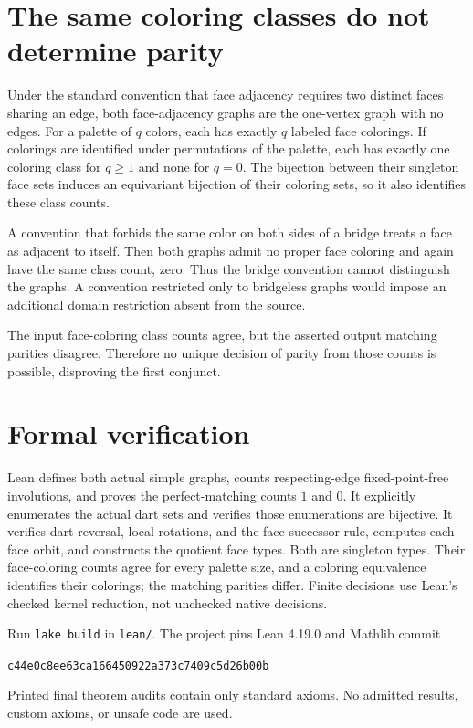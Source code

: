 \documentclass[11pt]{article}
\begin{document}
\section*{The same coloring classes do not determine parity}
Under the standard convention that face adjacency requires two distinct faces sharing an edge, both face-adjacency graphs are the one-vertex graph with no edges. For a palette of $q$ colors, each has exactly $q$ labeled face colorings. If colorings are identified under permutations of the palette, each has exactly one coloring class for $q\ge1$ and none for $q=0$. The bijection between their singleton face sets induces an equivariant bijection of their coloring sets, so it also identifies these class counts.

A convention that forbids the same color on both sides of a bridge treats a face as adjacent to itself. Then both graphs admit no proper face coloring and again have the same class count, zero. Thus the bridge convention cannot distinguish the graphs. A convention restricted only to bridgeless graphs would impose an additional domain restriction absent from the source.

The input face-coloring class counts agree, but the asserted output matching parities disagree. Therefore no unique decision of parity from those counts is possible, disproving the first conjunct.

\section*{Formal verification}
Lean defines both actual simple graphs, counts respecting-edge fixed-point-free involutions, and proves the perfect-matching counts $1$ and $0$. It explicitly enumerates the actual dart sets and verifies those enumerations are bijective. It verifies dart reversal, local rotations, and the face-successor rule, computes each face orbit, and constructs the quotient face types. Both are singleton types. Their face-coloring counts agree for every palette size, and a coloring equivalence identifies their colorings; the matching parities differ. Finite decisions use Lean's checked kernel reduction, not unchecked native decisions.

Run \texttt{lake build} in \texttt{lean/}. The project pins Lean 4.19.0 and Mathlib commit
\begin{center}\small\texttt{c44e0c8ee63ca166450922a373c7409c5d26b00b}\end{center}
Printed final theorem audits contain only standard axioms. No admitted results, custom axioms, or unsafe code are used.
\end{document}
